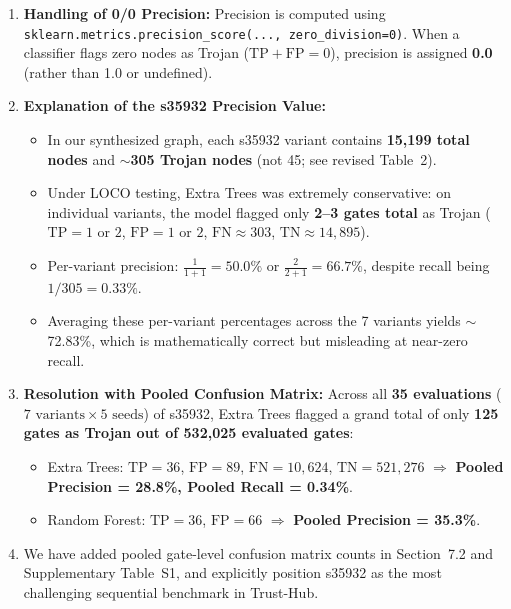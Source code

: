 \documentclass[11pt,a4paper]{article}
\begin{document}
\begin{enumerate}[leftmargin=*]
    \item \textbf{Handling of 0/0 Precision:} Precision is computed using \texttt{sklearn.metrics.precision\_score(..., zero\_division=0)}. When a classifier flags zero nodes as Trojan ($\text{TP} + \text{FP} = 0$), precision is assigned \textbf{0.0} (rather than 1.0 or undefined).

    \item \textbf{Explanation of the s35932 Precision Value:}
    \begin{itemize}
        \item In our synthesized graph, each s35932 variant contains \textbf{15,199 total nodes} and \textbf{$\sim$305 Trojan nodes} (not 45; see revised Table~2).
        \item Under LOCO testing, Extra Trees was extremely conservative: on individual variants, the model flagged only \textbf{2--3 gates total} as Trojan ($\text{TP}=1$ or $2$, $\text{FP}=1$ or $2$, $\text{FN} \approx 303$, $\text{TN} \approx 14{,}895$).
        \item Per-variant precision: $\frac{1}{1+1} = 50.0\%$ or $\frac{2}{2+1} = 66.7\%$, despite recall being $1/305 = 0.33\%$.
        \item Averaging these per-variant percentages across the 7 variants yields $\sim$72.83\%, which is mathematically correct but misleading at near-zero recall.
    \end{itemize}

    \item \textbf{Resolution with Pooled Confusion Matrix:} Across all \textbf{35 evaluations} ($7 \text{ variants} \times 5 \text{ seeds}$) of s35932, Extra Trees flagged a grand total of only \textbf{125 gates as Trojan out of 532,025 evaluated gates}:
    \begin{itemize}
        \item Extra Trees: $\text{TP}=36$, $\text{FP}=89$, $\text{FN}=10{,}624$, $\text{TN}=521{,}276$ $\Rightarrow$ \textbf{Pooled Precision = 28.8\%, Pooled Recall = 0.34\%}.
        \item Random Forest: $\text{TP}=36$, $\text{FP}=66$ $\Rightarrow$ \textbf{Pooled Precision = 35.3\%}.
    \end{itemize}

    \item We have added pooled gate-level confusion matrix counts in Section~7.2 and Supplementary Table~S1, and explicitly position s35932 as the most challenging sequential benchmark in Trust-Hub.
\end{enumerate}
\end{document}
